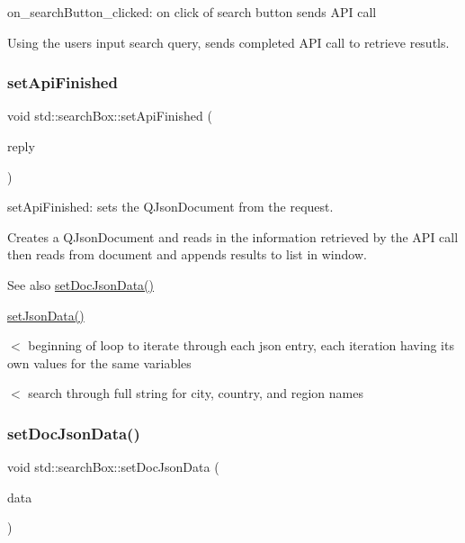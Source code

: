 on\+\_\+search\+Button\+\_\+clicked\+: on click of search button sends A\+PI call 

Using the users input search query, sends completed A\+PI call to retrieve resutls. \mbox{\label{classstd_1_1searchBox_ae809f6492d5745373277ec26009fa299}} 
\subsubsection{\texorpdfstring{set\+Api\+Finished}{setApiFinished}}
{\footnotesize\ttfamily void std\+::search\+Box\+::set\+Api\+Finished (\begin{DoxyParamCaption}\item[{Q\+Network\+Reply $\ast$}]{reply }\end{DoxyParamCaption})\hspace{0.3cm}{\ttfamily [slot]}}



set\+Api\+Finished\+: sets the Q\+Json\+Document from the request. 

Creates a Q\+Json\+Document and reads in the information retrieved by the A\+PI call then reads from document and appends results to list in window.

\begin{DoxySeeAlso}{See also}
\hyperlink{classstd_1_1searchBox_ae18823c4866780b727a9fbd626e9ec09}{set\+Doc\+Json\+Data()} 

\hyperlink{classstd_1_1searchBox_ae5f4b975f9d7958d1748de12777a9aca}{set\+Json\+Data()} 
\end{DoxySeeAlso}
$<$ beginning of loop to iterate through each json entry, each iteration having its own values for the same variables

$<$ search through full string for city, country, and region names \mbox{\label{classstd_1_1searchBox_ae18823c4866780b727a9fbd626e9ec09}} 
\subsubsection{\texorpdfstring{set\+Doc\+Json\+Data()}{setDocJsonData()}}
{\footnotesize\ttfamily void std\+::search\+Box\+::set\+Doc\+Json\+Data (\begin{DoxyParamCaption}\item[{Q\+Json\+Document}]{data }\end{DoxyParamCaption})}



